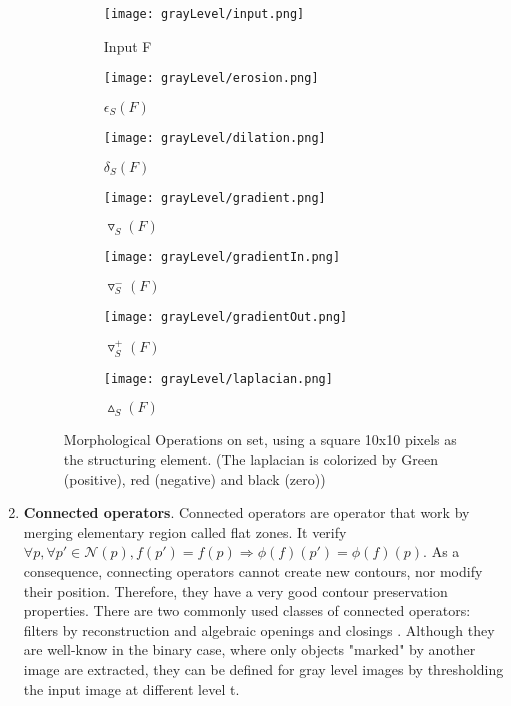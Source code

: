 \begin{enumerate}
\begin{figure}
	\begin{subfigure}{0.2\textwidth}
	 	\texttt{[image: grayLevel/input.png]} \caption{Input F}\label{fig:inputgrayLevel} \end{subfigure}
	\begin{subfigure}{0.2\textwidth}
	 	\texttt{[image: grayLevel/erosion.png]} \caption{$ \epsilon_S (F)$}\label{fig:erosiongrayLevel} \end{subfigure}
	\begin{subfigure}{0.2\textwidth}
		\texttt{[image: grayLevel/dilation.png]} \caption{$ \delta_S (F)$}\label{fig:dilationgrayLevel} \end{subfigure}
	\centering
		
	\begin{subfigure}{0.2\textwidth}
		\texttt{[image: grayLevel/gradient.png]} 
		\caption{$ \triangledown_S (F)$}\label{fig:gradientgrayLevel} \end{subfigure}
	\begin{subfigure}{0.2\textwidth}
		\texttt{[image: grayLevel/gradientIn.png]} 
		\caption{$ \triangledown_S ^- (F)$}\label{fig:gradientIngrayLevel} \end{subfigure}		
	\begin{subfigure}{0.2\textwidth}	
		\texttt{[image: grayLevel/gradientOut.png]} 
		\caption{$ \triangledown_S ^+ (F)$}\label{fig:gradientOutgrayLevel} \end{subfigure}
	\begin{subfigure}{0.2\textwidth}	
		\texttt{[image: grayLevel/laplacian.png]} 
		\caption{$\vartriangle_S (F)$}\label{fig:laplaciangrayLevel} \end{subfigure}					
	\centering
	\caption[Example of \textit{morphological operations} on gray level image] {Morphological Operations on set, using a square 10x10 pixels as the structuring element. (The laplacian is colorized by Green (positive), red (negative) and black (zero)) }
	\label{fig:grayLevelOperations}
\end{figure}


\item \textbf{Connected operators}. Connected operators \cite{Salembier95flatzones} are operator that work by merging elementary region called flat zones. It verify 
$ \forall p, \forall p' \in \mathcal{N}(p), f(p')=f(p) \Longrightarrow  \phi(f)(p')=\phi(f)(p)$. As a consequence, connecting operators cannot create new contours, nor modify their position. Therefore, they have a very good contour preservation properties. There are two commonly used classes of connected operators: filters by reconstruction and algebraic openings and closings \cite{Vincent.1993.tip}. Although they are well-know in the binary case, where only objects "marked" by another image are extracted, they can be defined for gray level images by thresholding the input image at different level t.  
\end{enumerate}
